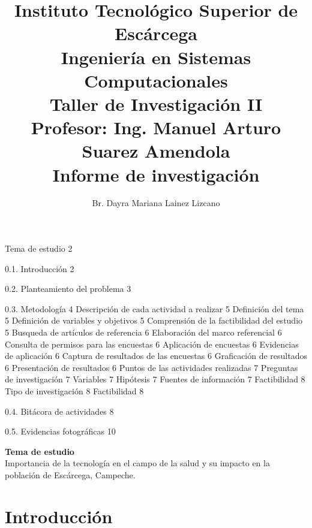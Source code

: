 \documentclass [a4paper, 12pt]{report}
\title{Instituto Tecnológico Superior de Escárcega\\ Ingeniería en Sistemas Computacionales\\ Taller de Investigación II\\ Profesor: Ing. Manuel Arturo Suarez Amendola\\ Informe de investigación}
\author{Br. Dayra Mariana Lainez Lizcano}
\begin{document}
 
 
\maketitle 

\makeindex
\begin{theindex}
\item      Tema de estudio      2
\item 0.1. Introducción          2
\item 0.2. Planteamiento del problema       3
\item 0.3. Metodología             4
\subitem Descripción de cada actividad a realizar             5
\subsubitem Definición del tema             5
\subsubitem Definición de variables y objetivos             5
\subsubitem Comprensión de la factibilidad del estudio             5
\subsubitem Busqueda de artículos de referencia             6
\subsubitem Elaboración del marco referencial             6
\subsubitem Consulta de permisos para las encuestas             6
\subsubitem Aplicación de encuestas             6
\subsubitem Evidencias de aplicación             6
\subsubitem Captura de resultados de las encuestas             6
\subsubitem Graficación de resultados             6
\subsubitem Presentación de resultados             6
\subitem Puntos de las actividades realizadas             7
\subsubitem Preguntas de investigación            7
\subsubitem Variables            7
\subsubitem Hipótesis            7
\subsubitem Fuentes de información            7
\subsubitem Factibilidad            8
\subsubitem Tipo de investigación            8
\subsubitem Factibilidad            8
\item 0.4. Bitácora de actividades            8
\item 0.5. Evidencias fotográficas            10
\end{theindex}

\begin{center}
\textbf{Tema de estudio \\} 
Importancia de la tecnología en el campo de la salud y su impacto en la población de Escárcega, Campeche.
\end{center}



\section{Introducción}
\end{document}
